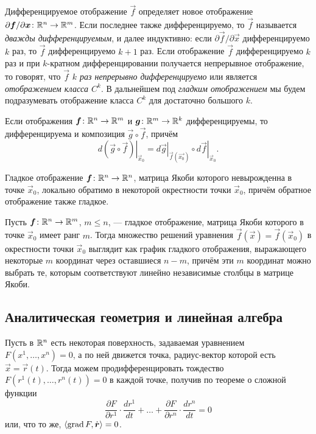 Дифференцируемое отображение $\vec{f}$ определяет новое отображение $\partial \boldsymbol{f} / \partial \boldsymbol{x}\colon \mathbb{R}^n \to \mathbb{R}^m$. Если последнее также дифференцируемо, то $\vec{f}$ называется \textit{дважды дифференцируемым}, и далее индуктивно: если $\partial\vec{f} / \partial\vec{x}$ дифференцируемо $k$ раз, то $\vec{f}$ дифференцируемо $k + 1$ раз. Если отображение $\vec{f}$ дифференцируемо $k$ раз и при $k$-кратном дифференцировании получается непрерывное отображение, то говорят, что $\vec{f}$ \textit{$k$ раз непрерывно дифференцируемо} или является \textit{отображением класса $C^k$}. В дальнейшем под \textit{гладким отображением} мы будем подразумевать отображение класса $C^k$ для достаточно большого $k$.

\begin{theorem}
	Если отображения $\boldsymbol{f}\colon \mathbb{R}^n \to \mathbb{R}^m$ и $\boldsymbol{g}\colon \mathbb{R}^m \to \mathbb{R}^k$ дифференцируемы, то дифференцируема и композиция $\vec{g} \circ \vec{f}$, причём
	\[
		\left.d(\vec{g} \circ \vec{f})\right|_{\vec{x}_0} = \left.d\vec{g}\right|_{\vec{f}(\vec{x_0})} \circ \left.d\vec{f}\right|_{\vec{x}_0}.
	\]
\end{theorem}

\begin{theorem}
	Гладкое отображение $\boldsymbol{f}\colon \mathbb{R}^n \to \mathbb{R}^n$, матрица Якоби которого невырожденна в точке $\vec{x}_0$, локально обратимо в некоторой окрестности точки $\vec{x}_0$, причём обратное отображение также гладкое.
\end{theorem}

\begin{theorem}
	Пусть $\boldsymbol{f}\colon \mathbb{R}^n \to \mathbb{R}^m$, $m \leqslant n$, --- гладкое отображение, матрица Якоби которого в точке $\vec{x}_0$ имеет ранг $m$. Тогда множество решений уравнения $\vec{f}(\vec{x}) = \vec{f}(\vec{x}_0)$ в окрестности точки $\vec{x}_0$ выглядит как график гладкого отображения, выражающего некоторые $m$ координат через оставшиеся $n - m$, причём эти $m$ координат можно выбрать те, которым соответствуют линейно независимые столбцы в матрице Якоби.
\end{theorem}

\subsection{Аналитическая геометрия и линейная алгебра}

Пусть в $\mathbb{R}^n$ есть некоторая поверхность, задаваемая уравнением $F(x^1, \ldots, x^n) = 0$, а по ней движется точка, радиус-вектор которой есть $\vec{x} = \vec{r}(t)$. Тогда можем продифференцировать тождество $F(r^1(t), \ldots, r^n(t)) = 0$ в каждой точке, получив по теореме о сложной функции
\[
	\frac{\partial F}{\partial r^1} \cdot \frac{d r^1}{dt} + \ldots + \frac{\partial F}{\partial r^n} \cdot \frac{d r^n}{dt} = 0
\]
или, что то же, $\langle \operatorname{grad} F, \dot{\boldsymbol{r}} \rangle = 0$.

